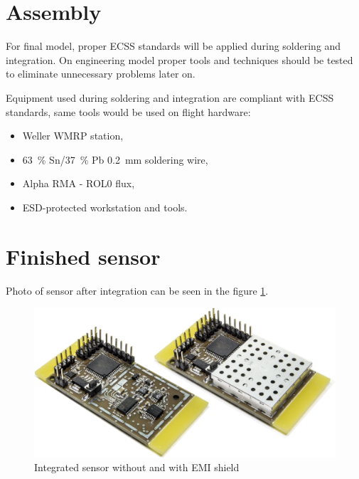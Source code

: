 \section{Assembly}
    For final model, proper ECSS standards will be applied during soldering and integration. On engineering model proper tools and techniques should be tested to eliminate unnecessary problems later on.

    Equipment used during soldering and integration are compliant with ECSS standards, same tools would be used on flight hardware:
    \begin{itemize}
        \item Weller WMRP station,
        \item \SI{63}{\percent} Sn/\SI{37}{\percent} Pb \SI{0.2}{\milli\meter} soldering wire,
        \item Alpha RMA - ROL0 flux,
        \item ESD-protected workstation and tools.
    \end{itemize}

\section{Finished sensor}
    Photo of sensor after integration can be seen in the figure \ref{Integrated_sensor}.

    \begin{figure}[H]
        \centering
        \includegraphics[width=0.8\paperwidth]{img/06/finishiedSensorPhoto.jpg}
        \caption{Integrated sensor without and with EMI shield}
        \label{Integrated_sensor}
    \end{figure}
